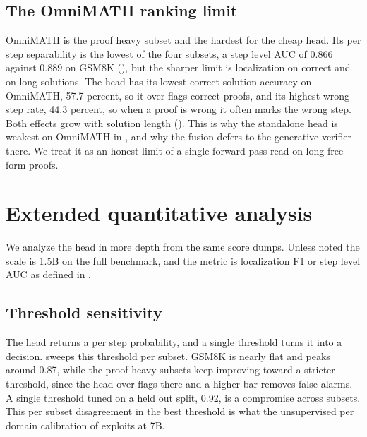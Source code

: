 \subsection{The OmniMATH ranking limit}
\label{app:omnimath}

OmniMATH is the proof heavy subset and the hardest for the cheap head. Its per step separability is the lowest of the four subsets, a step level AUC of 0.866 against 0.889 on GSM8K (), but the sharper limit is localization on correct and on long solutions. The head has its lowest correct solution accuracy on OmniMATH, 57.7 percent, so it over flags correct proofs, and its highest wrong step rate, 44.3 percent, so when a proof is wrong it often marks the wrong step. Both effects grow with solution length (). This is why the standalone head is weakest on OmniMATH in , and why the fusion defers to the generative verifier there. We treat it as an honest limit of a single forward pass read on long free form proofs.

\section{Extended quantitative analysis}
\label{app:extended}

We analyze the head in more depth from the same score dumps. Unless noted the scale is 1.5B on the full benchmark, and the metric is localization F1 or step level AUC as defined in .

\subsection{Threshold sensitivity}
\label{app:thr}

The head returns a per step probability, and a single threshold turns it into a decision.  sweeps this threshold per subset. GSM8K is nearly flat and peaks around 0.87, while the proof heavy subsets keep improving toward a stricter threshold, since the head over flags there and a higher bar removes false alarms. A single threshold tuned on a held out split, 0.92, is a compromise across subsets. This per subset disagreement in the best threshold is what the unsupervised per domain calibration of  exploits at 7B.

